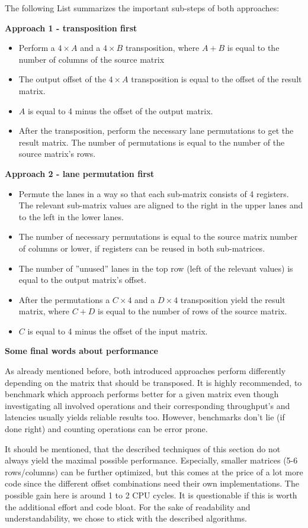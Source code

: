 The following List summarizes the important sub-steps of both approaches:

\vspace{1em}
\textbf{Approach 1 - transposition first}
\begin{itemize}
 	\item Perform a $4 \times A$ and a $4 \times B$ transposition, where $A + B$ is equal to the number of columns of the source matrix
 	\item The output offset of the $4 \times A$ transposition is equal to the offset of the result matrix.
 	\item $A$ is equal to 4 minus the offset of the output matrix.
 	\item After the transposition, perform the necessary lane permutations to get the result matrix. The number of permutations is equal to the number of the source matrix's rows.
\end{itemize}

\textbf{Approach 2 - lane permutation first}
\begin{itemize}
	\item Permute the lanes in a way so that each sub-matrix consists of 4 registers. The relevant sub-matrix values are aligned to the right in the upper lanes and to the left in the lower lanes.
	\item The number of necessary permutations is equal to the source matrix number of columns or lower, if registers can be reused in both sub-matrices.
	\item The number of ''unused'' lanes in the top row (left of the relevant values) is equal to the output matrix's offset.
	\item After the permutations a $C \times 4$ and a $D \times 4$ transposition yield the result matrix, where $C + D$ is equal to the number of rows of the source matrix.
	\item $C$ is equal to 4 minus the offset of the input matrix.
\end{itemize}

\vspace{1em}
\noindent\textbf{Some final words about performance}
\vspace{1em}

\noindent As already mentioned before, both introduced approaches perform differently depending on the matrix that should be transposed.
It is highly recommended, to benchmark which approach performs better for a given matrix even though investigating all involved operations and their corresponding throughput's and latencies usually yields reliable results too.
However, benchmarks don't lie (if done right) and counting operations can be error prone.

It should be mentioned, that the described techniques of this section do not always yield the maximal possible performance.
Especially, smaller matrices (5-6 rows/columns) can be further optimized, but this comes at the price of a lot more code since the different offset combinations need their own implementations.
The possible gain here is around 1 to 2 CPU cycles.
It is questionable if this is worth the additional effort and code bloat.
For the sake of readability and understandability, we chose to stick with the described algorithms.
